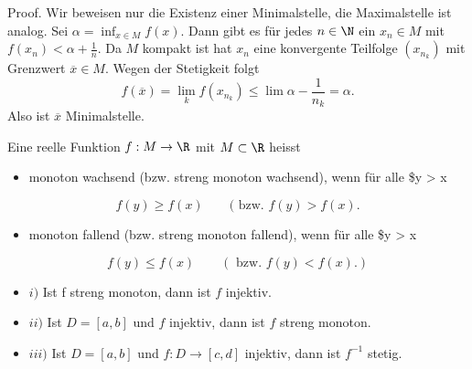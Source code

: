 \documentclass[letterpaper,10pt,english]{jupyterBook}
\begin{document}
\begin{emphBox}{}{}
Proof. Wir beweisen nur die Existenz einer Minimalstelle, die Maximalstelle ist analog. Sei \(\alpha = \inf_{x \in M} f(x)\). Dann gibt es für jedes \(n \in \N\) ein \(x_n \in M\) mit \(f(x_n) < \alpha+ \frac{1}n\). Da \(M\) kompakt ist hat \(x_n\) eine konvergente Teilfolge \((x_{n_k})\) mit Grenzwert \(\overline{x} \in M\). Wegen der Stetigkeit folgt
\begin{equation*}
 f(\overline{x}) = \lim_k f(x_{n_k}) \leq \lim \alpha - \frac{1}{n_k} = \alpha.
\end{equation*}
Also ist \(\overline{x}\) Minimalstelle.
\end{emphBox}
\label{stetigkeit/eigenschaften:definition-3}
\begin{definition}{}{}



Eine reelle Funktion \(f: M \rightarrow \R\) mit \(M \subset \R\) heisst
\begin{itemize}
\item {} 
monoton wachsend (bzw. streng monoton wachsend), wenn für alle \$y > x

\end{itemize}
\begin{equation*}
 f(y) \geq f(x) \qquad (\text{ bzw. } f(y) > f(x).
\end{equation*}\begin{itemize}
\item {} 
monoton fallend (bzw. streng monoton fallend), wenn für alle \$y > x

\end{itemize}
\begin{equation*}
 f(y) \leq f(x) \qquad (\text{ bzw. } f(y) < f(x). )
\end{equation*}\end{definition}
\label{stetigkeit/eigenschaften:theorem-4}
\begin{theorem}{}{}


\begin{itemize}
\item {} 
\(i)\) Ist f streng monoton, dann ist \(f\) injektiv.

\item {} 
\(ii)\) Ist \(D=[a,b]\) und \(f\) injektiv, dann ist \(f\) streng monoton.

\item {} 
\(iii)\) Ist \(D=[a,b]\) und \(f:D \rightarrow [c,d]\) injektiv, dann ist \(f^{-1}\) stetig.

\end{itemize}
\end{theorem}
\end{document}
